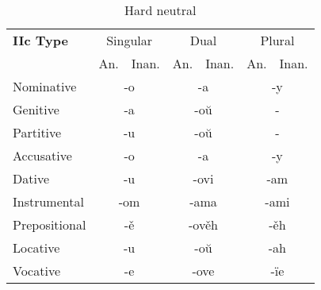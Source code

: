 \begin{table}
	\caption{Hard neutral}
	\begin{tabular}{lllllll}
		\textbf{IIc Type}       
		& \multicolumn{2}{c}{Singular} 
		& \multicolumn{2}{c}{Dual} 
		& \multicolumn{2}{c}{Plural} \\
		& An.   & Inan.  & An.   & Inan.   & An.  & Inan. \\
		Nominative    & \multicolumn{2}{c}{-o}      
		& \multicolumn{2}{c}{-a}        
		& \multicolumn{2}{c}{-y} \\
		Genitive      & \multicolumn{2}{c}{-a}       
		& \multicolumn{2}{c}{-oŭ}      
		& \multicolumn{2}{c}{-}   \\
		Partitive     & \multicolumn{2}{c}{-u}       
		& \multicolumn{2}{c}{-oŭ}      
		& \multicolumn{2}{c}{-} \\
		Accusative    & \multicolumn{2}{c}{-o}     
		& \multicolumn{2}{c}{-a} 
		& \multicolumn{2}{c}{-y} \\
		Dative        & \multicolumn{2}{c}{-u}       
		& \multicolumn{2}{c}{-ovi}     
		& \multicolumn{2}{c}{-am} \\
		Instrumental  & \multicolumn{2}{c}{-om}     
		& \multicolumn{2}{c}{-ama}     
		& \multicolumn{2}{c}{-ami} \\
		Prepositional & \multicolumn{2}{c}{-ě}       
		& \multicolumn{2}{c}{-ověh}     
		& \multicolumn{2}{c}{-ěh} \\
		Locative      & \multicolumn{2}{c}{-u}      
		& \multicolumn{2}{c}{-oŭ}       
		& \multicolumn{2}{c}{-ah} \\ 
		Vocative      & \multicolumn{2}{c}{-e}       
		& \multicolumn{2}{c}{-ove}      
		& \multicolumn{2}{c}{-ïe}
	\end{tabular}
\end{table}

